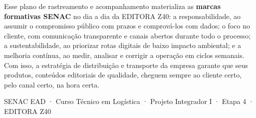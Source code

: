 \documentclass[10pt,a4paper]{article}
\newcommand{\footerfont}{\fontsize{6.3}{8}\selectfont}
\newcommand{\rodapeetapa}[1]{%
  \vspace{24pt}{\color{midblue}\rule{\linewidth}{1.2pt}}\par
  \vspace{7pt}\begin{center}{\footerfont\color{graylab}SENAC EAD · Curso Técnico em Logística · Projeto Integrador I · Etapa #1 · EDITORA Z40}\end{center}}
\begin{document}
Esse plano de rastreamento e acompanhamento materializa as \textbf{marcas formativas SENAC} no dia a dia da EDITORA Z40: a responsabilidade, ao assumir o compromisso público com prazos e comprová-los com dados; o foco no cliente, com comunicação transparente e canais abertos durante todo o processo; a sustentabilidade, ao priorizar rotas digitais de baixo impacto ambiental; e a melhoria contínua, ao medir, analisar e corrigir a operação em ciclos semanais. Com isso, a estratégia de distribuição e transporte da empresa garante que seus produtos, conteúdos editoriais de qualidade, cheguem sempre ao cliente certo, pelo canal certo, na hora certa.

\rodapeetapa{4}
\end{document}

